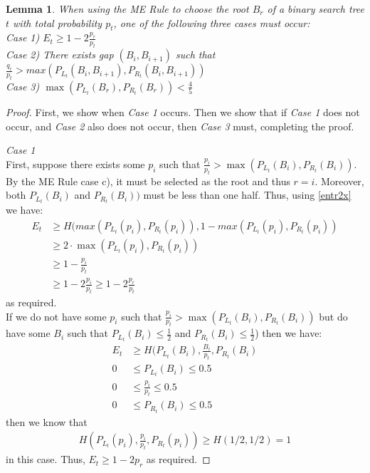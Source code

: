 \documentclass[letterpaper,12pt,titlepage,oneside,final]{book}
\theoremstyle{plain}
\newtheorem{lem}[thm]{Lemma}
\begin{document}
\begin{lem}\label{MECases}
When using the ME Rule to choose the root $B_r$ of a binary search tree $t$ with total probability $p_t$, one of the following three cases must occur: \\
\textit{Case 1)} $E_t \geq 1-2 \frac{p_r}{p_t}$ \\
\textit{Case 2)} There exists gap $(B_i, B_{i+1})$ such that $\frac{q_i}{p_t} > max(P_{L_t}(B_i, B_{i+1}), P_{R_t}(B_i, B_{i+1}))$\\
\textit{Case 3)}  $\max(P_{L_t}(B_r), P_{R_t}(B_r)) < \frac{4}{5}$\\
\end{lem}
\begin{proof} First, we show when \textit{Case 1} occurs. Then we show that if \textit{Case 1} does not occur, and \textit{Case 2} also does not occur, then \textit{Case 3} must, completing the proof. 


\noindent\textit{Case 1} \\
 First, suppose there exists some $p_i$ such that $\frac{p_i}{p_t} > \max(P_{L_t}(B_i), P_{R_t}(B_i))$. By the ME Rule case c), it must be selected as the root and thus $r=i$. Moreover, both $P_{L_t}(B_i)$ and $P_{R_t}(B_i))$ must be less than one half. Thus, using \ref{entr2x} we have: 
\begin{align*}
E_t &\geq H( max(P_{L_t}(p_i), P_{R_t}(p_i)), 1-max(P_{L_t}(p_i), P_{R_t}(p_i)) \\
 &\geq 2\cdot \max(P_{L_t}(p_i), P_{R_t}(p_i)) \\  &\geq 1-\frac{p_i}{p_t} \\ 
 &\geq 1-2 \frac{p_i}{p_t} \geq 1-2 \frac{p_r}{p_t} 
\end{align*}
 as required. \\
 
If we do not have some $p_i$ such that $\frac{p_i}{p_t} > \max(P_{L_t}(B_i), P_{R_t}(B_i))$ but do have some $B_i$ such that $P_{L_t}(B_i) \leq \frac{1}{2}$ and $P_{R_t}(B_i) \leq \frac{1}{2}$) then we have:
\begin{align*}
 E_t &\geq H(P_{L_t}(B_i), \frac{B_i}{p_t} , P_{R_t}(B_i) \\
 0 &\leq P_{L_t}(B_i) \leq 0.5 \\
 0 &\leq \frac{p_i}{p_t} \leq 0.5 \\
 0 &\leq P_{R_t}(B_i) \leq 0.5
\end{align*} 
   then we know that \\
\begin{align*}
H(P_{L_t}(p_i), \frac{p_i}{p_t} , P_{R_t}(p_i)) \geq H(1/2, 1/2) = 1
\end{align*}
in this case.
 Thus, $E_t \geq 1-2p_r$ as required.


\end{proof}
\end{document}
